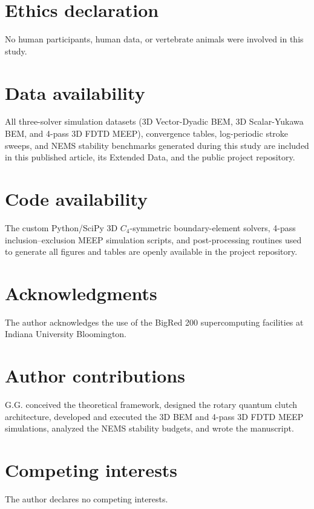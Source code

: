 \documentclass[pdflatex,sn-nature]{sn-jnl}
\begin{document}
\section*{Ethics declaration}
No human participants, human data, or vertebrate animals were involved in this study.

\section*{Data availability}
All three-solver simulation datasets (3D Vector-Dyadic BEM, 3D Scalar-Yukawa BEM, and 4-pass 3D FDTD MEEP), convergence tables, log-periodic stroke sweeps, and NEMS stability benchmarks generated during this study are included in this published article, its Extended Data, and the public project repository.

\section*{Code availability}
The custom Python/SciPy 3D $C_4$-symmetric boundary-element solvers, 4-pass inclusion--exclusion MEEP simulation scripts, and post-processing routines used to generate all figures and tables are openly available in the project repository.

\section*{Acknowledgments}
The author acknowledges the use of the BigRed 200 supercomputing facilities at Indiana University Bloomington.

\section*{Author contributions}
G.G. conceived the theoretical framework, designed the rotary quantum clutch architecture, developed and executed the 3D BEM and 4-pass 3D FDTD MEEP simulations, analyzed the NEMS stability budgets, and wrote the manuscript.

\section*{Competing interests}
The author declares no competing interests.

% 


\clearpage
\renewcommand{\thefigure}{\arabic{figure}}
\renewcommand{\figurename}{Extended Data Fig.}
\setcounter{figure}{0}
\renewcommand{\thetable}{\arabic{table}}
\renewcommand{\tablename}{Extended Data Table}
\setcounter{table}{0}
\end{document}
